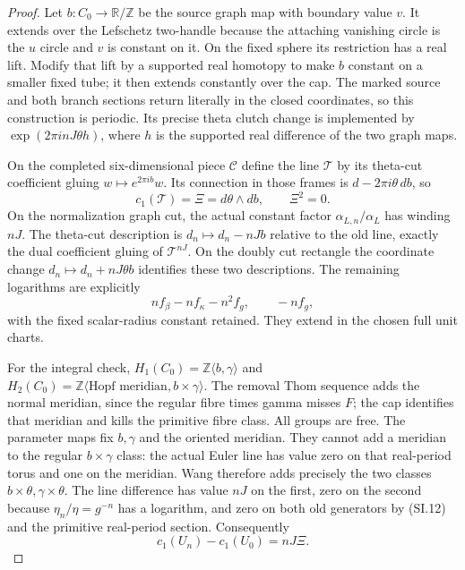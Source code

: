 \begin{proof}
Let \(b:C_0\to\mathbb R/\mathbb Z\) be the source graph map with boundary
value \(v\). It extends over the Lefschetz two-handle because the
attaching vanishing circle is the \(u\) circle and \(v\) is constant on
it. On the fixed sphere its restriction has a real lift. Modify that
lift by a supported real homotopy to make \(b\) constant on a smaller
fixed tube; it then extends constantly over the cap. The marked
source and both branch sections return literally in the closed
coordinates, so this construction is periodic. Its precise theta
clutch change is implemented by \(\exp(2\pi i nJ\theta h)\), where \(h\)
is the supported real difference of the two graph maps.

On the completed six-dimensional piece \(\mathcal C\) define the line
\(\mathcal T\) by its theta-cut coefficient gluing
\(w\mapsto e^{2\pi i b}w\). Its connection in those frames is
\(d-2\pi i\theta\,db\), so
\[
 c_1(\mathcal T)=\Xi=d\theta\wedge db,\qquad\Xi^2=0.
                                                        \tag{SI.19}
\]
On the normalization graph cut, the actual constant factor
\(\alpha_{L,n}/\alpha_L\) has winding \(nJ\). The theta-cut description is
\(d_n\mapsto d_n-nJb\) relative to the old line, exactly the dual
coefficient gluing of \(\mathcal T^{nJ}\). On the doubly cut rectangle
the coordinate change \(d_n\mapsto d_n+nJ\theta b\) identifies these
two descriptions. The remaining logarithms are explicitly
\[
 nf_\beta-nf_\kappa-n^2f_g,
 \qquad -nf_g,                                       \tag{SI.20}
\]
with the fixed scalar-radius constant retained. They extend in the
chosen full unit charts.

For the integral check, \(H_1(C_0)=\mathbb Z\langle b,\gamma\rangle\) and
\(H_2(C_0)=\mathbb Z\langle\text{Hopf meridian},b\times\gamma\rangle\).
The removal Thom sequence adds the normal meridian, since the
regular fibre times gamma misses \(F\); the cap identifies that
meridian and kills the primitive fibre class. All groups are free.
The parameter maps fix \(b,\gamma\) and the oriented meridian. They
cannot add a meridian to the regular \(b\times\gamma\) class: the actual
Euler line has value zero on that real-period torus and one on the
meridian. Wang therefore adds precisely the two classes
\(b\times\theta,\gamma\times\theta\). The line difference has value
\(nJ\) on the first, zero on the second because \(\eta_n/\eta=g^{-n}\)
has a logarithm, and zero on both old generators by (SI.12) and the
primitive real-period section. Consequently
\[
 c_1(U_n)-c_1(U_0)=nJ\Xi.                            \tag{SI.21}
\]


\end{proof}
